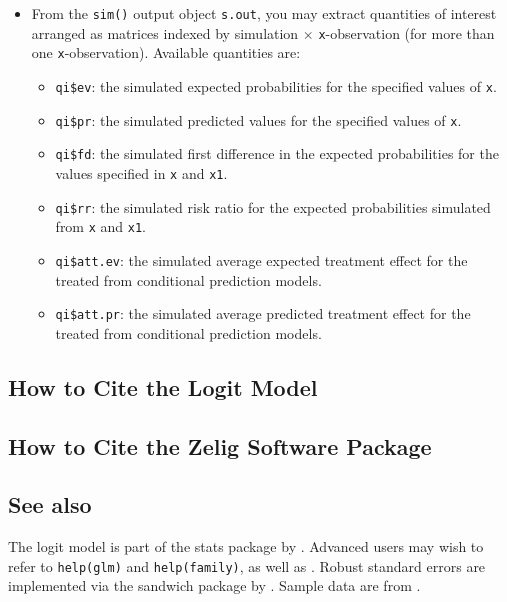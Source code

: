 \documentclass{article}
\begin{document}
\begin{itemize}
\item From the {\tt sim()} output object {\tt s.out}, you may extract
  quantities of interest arranged as matrices indexed by simulation
  $\times$ {\tt x}-observation (for more than one {\tt x}-observation).
  Available quantities are:

   \begin{itemize}
   \item {\tt qi\$ev}: the simulated expected probabilities for the
     specified values of {\tt x}.
   \item {\tt qi\$pr}: the simulated predicted values for the
     specified values of {\tt x}.
   \item {\tt qi\$fd}: the simulated first difference in the expected
     probabilities for the values specified in {\tt x} and {\tt x1}.
   \item {\tt qi\$rr}: the simulated risk ratio for the expected
     probabilities simulated from {\tt x} and {\tt x1}.
   \item {\tt qi\$att.ev}: the simulated average expected treatment
     effect for the treated from conditional prediction models.  
   \item {\tt qi\$att.pr}: the simulated average predicted treatment
     effect for the treated from conditional prediction models.  
   \end{itemize}
\end{itemize}





\subsection*{How to Cite the Logit Model}

\subsection*{How to Cite the Zelig Software Package}
\CiteZelig


\subsection*{See also}
The logit model is part of the stats package by \citet{VenRip02}.
Advanced users may wish to refer to \texttt{help(glm)} and
\texttt{help(family)}, as well as \cite{McCNel89}. Robust standard
errors are implemented via the sandwich package by \citet{Zeileis04}.
Sample data are from \cite{KinTomWit00}.





 
\end{document}

